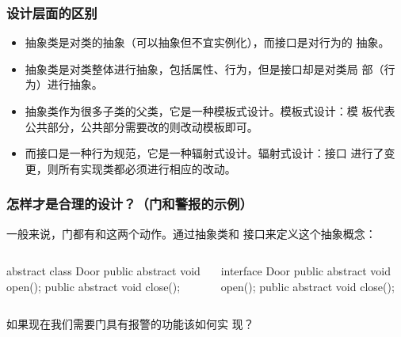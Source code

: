 \begin{frame}[fragile]
  \frametitle{设计层面的区别}

  \begin{block}{}
    \begin{itemize}\kai
    \item 抽象类是对类的抽象（可以抽象但不宜实例化），而接口是对行为的
      抽象。
    \item 抽象类是对类整体进行抽象，包括属性、行为，但是接口却是对类局
      部（行为）进行抽象。
    \end{itemize}
  \end{block}

  \pause

  \begin{block}{}
    \begin{itemize}\kai
    \item 抽象类作为很多子类的父类，它是一种模板式设计。{\Red 模板式设计：模
      板代表公共部分，公共部分需要改的则改动模板即可。}
    \item 而接口是一种行为规范，它是一种辐射式设计。{\Red 辐射式设计：接口
      进行了变更，则所有实现类都必须进行相应的改动。}
    \end{itemize}
  \end{block}  

\end{frame}

\begin{frame}[fragile]
  \frametitle{怎样才是合理的设计？（门和警报的示例）}

  一般来说，门都有和这两个动作。通过抽象类和
  接口来定义这个抽象概念：

  \begin{columns}

    \begin{javaCode}
      abstract class Door {
        public abstract void open();
        public abstract void close();
      }
    \end{javaCode}

    \begin{javaCode}
      interface Door {
        public abstract void open();
        public abstract void close();
      }
    \end{javaCode}
  \end{columns}

  \pause
  
   如果现在我们需要门具有报警的功能该如何实
  现？
\end{frame}

